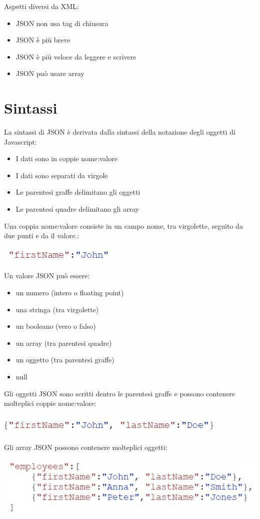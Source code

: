 Aspetti diversi da XML:
\begin{itemize}
    \item JSON non usa tag di chiusura
    \item JSON è più breve
    \item JSON è più veloce da leggere e scrivere
    \item JSON può usare array
\end{itemize}

\section{Sintassi}
La sintassi di JSON è derivata dalla sintassi della notazione degli oggetti di Javascript:
\begin{itemize}
    \item I dati sono in coppie nome:valore
    \item I dati sono separati da virgole
    \item Le parentesi graffe delimitano gli oggetti
    \item Le parentesi quadre delimitano gli array
\end{itemize}
Una coppia nome:valore consiste in un campo nome, tra virgolette, seguito da due punti e da il valore.:
\begin{center}
    \includegraphics[scale=0.4]{Images/TecnologieWeb/6/FirstNameJohn.jpg}
\end{center}
Un valore JSON può essere:
\begin{itemize}
    \item un numero (intero o floating point)
    \item una stringa (tra virgolette)
    \item un booleano (vero o falso)
    \item un array (tra parentesi quadre)
    \item un oggetto (tra parentesi graffe)
    \item null
\end{itemize}
Gli oggetti JSON sono scritti dentro le parentesi graffe e possono contenere molteplici coppie nome:valore:
\begin{center}
    \includegraphics[scale=0.4]{Images/TecnologieWeb/6/FirstLastNAme.jpg}
\end{center}
Gli array JSON possono contenere molteplici oggetti:
\begin{center}
    \includegraphics[scale=0.4]{Images/TecnologieWeb/6/Employees.jpg}
\end{center}



